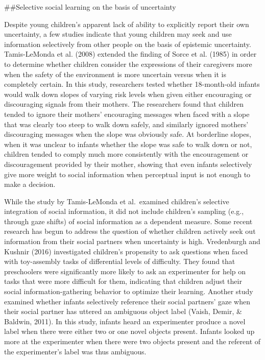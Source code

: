 \documentclass[,man,floatsintext]{apa6}
\begin{document}
\#\#Selective social learning on the basis of uncertainty

Despite young children's apparent lack of ability to explicitly report their own uncertainty, a few studies indicate that young children may seek and use information selectively from other people on the basis of epistemic uncertainty. Tamis-LeMonda et al. (2008) extended the finding of Sorce et al. (1985) in order to determine whether children consider the expressions of their caregivers more when the safety of the environment is more uncertain versus when it is completely certain. In this study, researchers tested whether 18-month-old infants would walk down slopes of varying risk levels when given either encouraging or discouraging signals from their mothers. The researchers found that children tended to ignore their mothers' encouraging messages when faced with a slope that was clearly too steep to walk down safely, and similarly ignored mothers' discouraging messages when the slope was obviously safe. At borderline slopes, when it was unclear to infants whether the slope was safe to walk down or not, children tended to comply much more consistently with the encouragement or discouragement provided by their mother, showing that even infants selectively give more weight to social information when perceptual input is not enough to make a decision.

While the study by Tamis-LeMonda et al.~examined children's selective integration of social information, it did not include children's sampling (e.g., through gaze shifts) of social information as a dependent measure. Some recent research has begun to address the question of whether children actively seek out information from their social partners when uncertainty is high. Vredenburgh and Kushnir (2016) investigated children's propensity to ask questions when faced with toy-assembly tasks of differential levels of difficulty. They found that preschoolers were significantly more likely to ask an experimenter for help on tasks that were more difficult for them, indicating that children adjust their social information-gathering behavior to optimize their learning. Another study examined whether infants selectively reference their social partners' gaze when their social partner has uttered an ambiguous object label (Vaish, Demir, \& Baldwin, 2011). In this study, infants heard an experimenter produce a novel label when there were either two or one novel objects present. Infants looked up more at the experimenter when there were two objects present and the referent of the experimenter's label was thus ambiguous.
\end{document}
